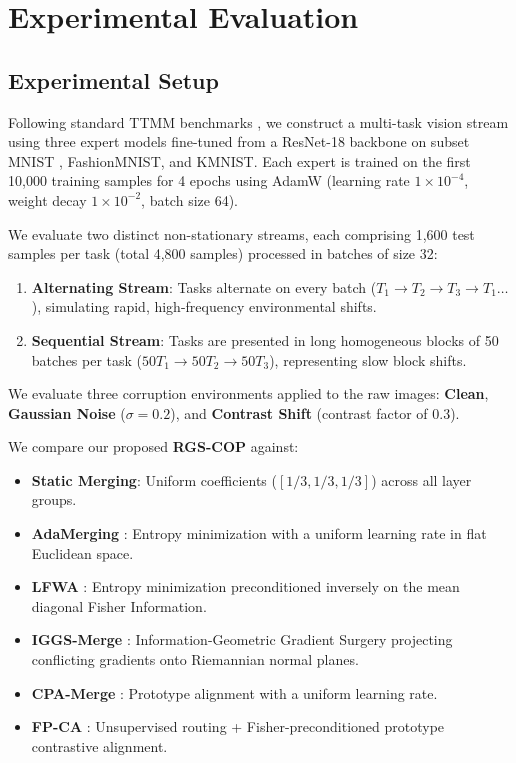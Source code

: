 \documentclass{article}
\theoremstyle{plain}
\theoremstyle{definition}
\theoremstyle{remark}
\begin{document}
\section{Experimental Evaluation}
\subsection{Experimental Setup}
Following standard TTMM benchmarks \cite{Submission2Paper, Submission7Paper}, we construct a multi-task vision stream using three expert models fine-tuned from a ResNet-18 backbone \cite{He2016} on subset MNIST \cite{Krizhevsky2012}, FashionMNIST, and KMNIST. Each expert is trained on the first 10,000 training samples for 4 epochs using AdamW (learning rate $1 \times 10^{-4}$, weight decay $1\times 10^{-2}$, batch size 64).

We evaluate two distinct non-stationary streams, each comprising 1,600 test samples per task (total 4,800 samples) processed in batches of size 32:
\begin{enumerate}
    \item \textbf{Alternating Stream}: Tasks alternate on every batch ($T_1 \to T_2 \to T_3 \to T_1 \dots$), simulating rapid, high-frequency environmental shifts.
    \item \textbf{Sequential Stream}: Tasks are presented in long homogeneous blocks of 50 batches per task ($50T_1 \to 50T_2 \to 50T_3$), representing slow block shifts.
\end{enumerate}
We evaluate three corruption environments applied to the raw images: \textbf{Clean}, \textbf{Gaussian Noise} ($\sigma=0.2$), and \textbf{Contrast Shift} (contrast factor of $0.3$).

We compare our proposed \textbf{RGS-COP} against:
\begin{itemize}
    \item \textbf{Static Merging}: Uniform coefficients ($[1/3, 1/3, 1/3]$) across all layer groups.
    \item \textbf{AdaMerging} \cite{Yang2024}: Entropy minimization with a uniform learning rate in flat Euclidean space.
    \item \textbf{LFWA} \cite{Submission2Paper}: Entropy minimization preconditioned inversely on the mean diagonal Fisher Information.
    \item \textbf{IGGS-Merge} \cite{Submission7Paper}: Information-Geometric Gradient Surgery projecting conflicting gradients onto Riemannian normal planes.
    \item \textbf{CPA-Merge} \cite{Ruan2024}: Prototype alignment with a uniform learning rate.
    \item \textbf{FP-CA} \cite{Submission2Paper}: Unsupervised routing + Fisher-preconditioned prototype contrastive alignment.
\end{itemize}
\end{document}
